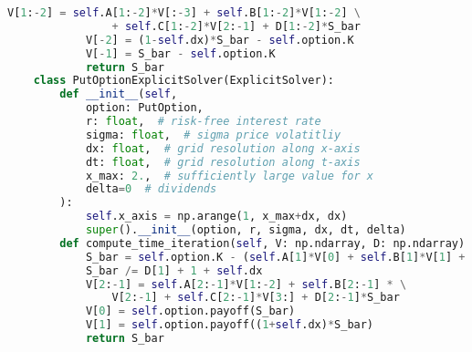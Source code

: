 \begin{lstlisting}[language=Python, caption=Explicit solver for Nielsen transformation.]
            V[1:-2] = self.A[1:-2]*V[:-3] + self.B[1:-2]*V[1:-2] \
                + self.C[1:-2]*V[2:-1] + D[1:-2]*S_bar
            V[-2] = (1-self.dx)*S_bar - self.option.K
            V[-1] = S_bar - self.option.K
            return S_bar
    class PutOptionExplicitSolver(ExplicitSolver):
        def __init__(self, 
            option: PutOption,
            r: float,  # risk-free interest rate
            sigma: float,  # sigma price volatitliy
            dx: float,  # grid resolution along x-axis
            dt: float,  # grid resolution along t-axis
            x_max: 2.,  # sufficiently large value for x
            delta=0  # dividends
        ):
            self.x_axis = np.arange(1, x_max+dx, dx)
            super().__init__(option, r, sigma, dx, dt, delta)
        def compute_time_iteration(self, V: np.ndarray, D: np.ndarray) -> float:
            S_bar = self.option.K - (self.A[1]*V[0] + self.B[1]*V[1] + self.C[1]*V[2])
            S_bar /= D[1] + 1 + self.dx
            V[2:-1] = self.A[2:-1]*V[1:-2] + self.B[2:-1] * \
                V[2:-1] + self.C[2:-1]*V[3:] + D[2:-1]*S_bar
            V[0] = self.option.payoff(S_bar)
            V[1] = self.option.payoff((1+self.dx)*S_bar)
            return S_bar
\end{lstlisting}

